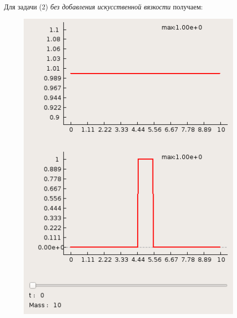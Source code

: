 \documentclass[a4paper, 11pt]{article}
\begin{document}
Для задачи (2) \textit{без добавления искусственной вязкости} получаем:
\begin{figure}[H]
	\begin{minipage}[h] {0.49\linewidth}
		\includegraphics[width=1\linewidth]{p2/p2_t=0.png}
	\end{minipage}
	\begin{minipage}[h] {0.49\linewidth}

\end{minipage}
\end{figure}
\end{document}
